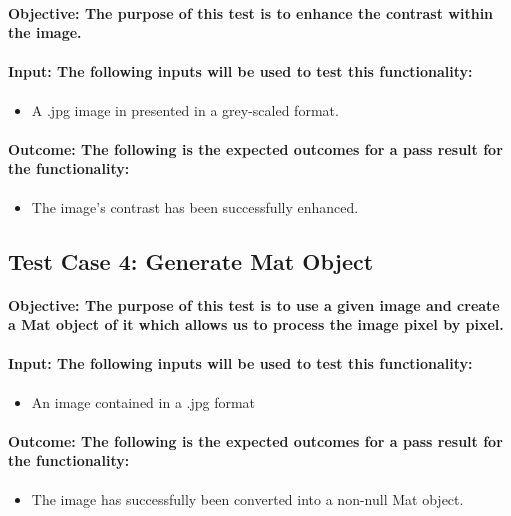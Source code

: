 \documentclass[a4paper,12pt]{report}
\begin{document}
	\paragraph{Objective: The purpose of this test is to enhance the contrast within the image.}
	\paragraph{Input: The following inputs will be used to test this functionality:}
	\begin{itemize}
		\item A .jpg image in presented in a grey-scaled format.
	\end{itemize}
	\paragraph{Outcome: The following is the expected outcomes for a pass result for the functionality:}
	\begin{itemize}
		\item The image's contrast has been successfully enhanced.
	\end{itemize}
		
	\subsection{Test Case 4: Generate Mat Object}
	\paragraph{Objective: The purpose of this test is to use a given image and create a Mat object of it which allows us to process the image pixel by pixel.}
	\paragraph{Input: The following inputs will be used to test this functionality:}
	\begin{itemize}
		\item An image contained in a .jpg format
	\end{itemize}
	\paragraph{Outcome: The following is the expected outcomes for a pass result for the functionality:}
	\begin{itemize}
		\item The image has successfully been converted into a non-null Mat object.
	\end{itemize}	
	
\end{document}

